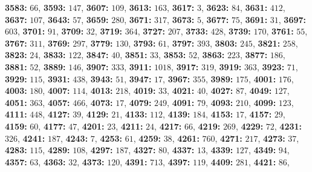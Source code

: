 \textsf{\bfseries 3583:} $66$, \textsf{\bfseries 3593:} $147$, \textsf{\bfseries 3607:} $109$, \textsf{\bfseries 3613:} $163$, \textsf{\bfseries 3617:} $3$, \textsf{\bfseries 3623:} $84$, \textsf{\bfseries 3631:} $412$, \textsf{\bfseries 3637:} $107$, \textsf{\bfseries 3643:} $57$, \textsf{\bfseries 3659:} $280$, \textsf{\bfseries 3671:} $317$, \textsf{\bfseries 3673:} $5$, \textsf{\bfseries 3677:} $75$, \textsf{\bfseries 3691:} $31$, \textsf{\bfseries 3697:} $603$, \textsf{\bfseries 3701:} $91$, \textsf{\bfseries 3709:} $32$, \textsf{\bfseries 3719:} $364$, \textsf{\bfseries 3727:} $207$, \textsf{\bfseries 3733:} $428$, \textsf{\bfseries 3739:} $170$, \textsf{\bfseries 3761:} $55$, \textsf{\bfseries 3767:} $311$, \textsf{\bfseries 3769:} $297$, \textsf{\bfseries 3779:} $130$, \textsf{\bfseries 3793:} $61$, \textsf{\bfseries 3797:} $393$, \textsf{\bfseries 3803:} $245$, \textsf{\bfseries 3821:} $258$, \textsf{\bfseries 3823:} $24$, \textsf{\bfseries 3833:} $122$, \textsf{\bfseries 3847:} $40$, \textsf{\bfseries 3851:} $33$, \textsf{\bfseries 3853:} $52$, \textsf{\bfseries 3863:} $223$, \textsf{\bfseries 3877:} $186$, \textsf{\bfseries 3881:} $52$, \textsf{\bfseries 3889:} $146$, \textsf{\bfseries 3907:} $333$, \textsf{\bfseries 3911:} $1018$, \textsf{\bfseries 3917:} $319$, \textsf{\bfseries 3919:} $363$, \textsf{\bfseries 3923:} $71$, \textsf{\bfseries 3929:} $115$, \textsf{\bfseries 3931:} $438$, \textsf{\bfseries 3943:} $51$, \textsf{\bfseries 3947:} $17$, \textsf{\bfseries 3967:} $355$, \textsf{\bfseries 3989:} $175$, \textsf{\bfseries 4001:} $176$, \textsf{\bfseries 4003:} $180$, \textsf{\bfseries 4007:} $114$, \textsf{\bfseries 4013:} $218$, \textsf{\bfseries 4019:} $33$, \textsf{\bfseries 4021:} $40$, \textsf{\bfseries 4027:} $87$, \textsf{\bfseries 4049:} $127$, \textsf{\bfseries 4051:} $363$, \textsf{\bfseries 4057:} $466$, \textsf{\bfseries 4073:} $17$, \textsf{\bfseries 4079:} $249$, \textsf{\bfseries 4091:} $79$, \textsf{\bfseries 4093:} $210$, \textsf{\bfseries 4099:} $123$, \textsf{\bfseries 4111:} $448$, \textsf{\bfseries 4127:} $39$, \textsf{\bfseries 4129:} $21$, \textsf{\bfseries 4133:} $112$, \textsf{\bfseries 4139:} $184$, \textsf{\bfseries 4153:} $17$, \textsf{\bfseries 4157:} $29$, \textsf{\bfseries 4159:} $60$, \textsf{\bfseries 4177:} $47$, \textsf{\bfseries 4201:} $23$, \textsf{\bfseries 4211:} $24$, \textsf{\bfseries 4217:} $66$, \textsf{\bfseries 4219:} $269$, \textsf{\bfseries 4229:} $72$, \textsf{\bfseries 4231:} $326$, \textsf{\bfseries 4241:} $187$, \textsf{\bfseries 4243:} $7$, \textsf{\bfseries 4253:} $61$, \textsf{\bfseries 4259:} $38$, \textsf{\bfseries 4261:} $760$, \textsf{\bfseries 4271:} $217$, \textsf{\bfseries 4273:} $37$, \textsf{\bfseries 4283:} $115$, \textsf{\bfseries 4289:} $108$, \textsf{\bfseries 4297:} $187$, \textsf{\bfseries 4327:} $80$, \textsf{\bfseries 4337:} $13$, \textsf{\bfseries 4339:} $127$, \textsf{\bfseries 4349:} $94$, \textsf{\bfseries 4357:} $63$, \textsf{\bfseries 4363:} $32$, \textsf{\bfseries 4373:} $120$, \textsf{\bfseries 4391:} $713$, \textsf{\bfseries 4397:} $119$, \textsf{\bfseries 4409:} $281$, \textsf{\bfseries 4421:} $86$, 
